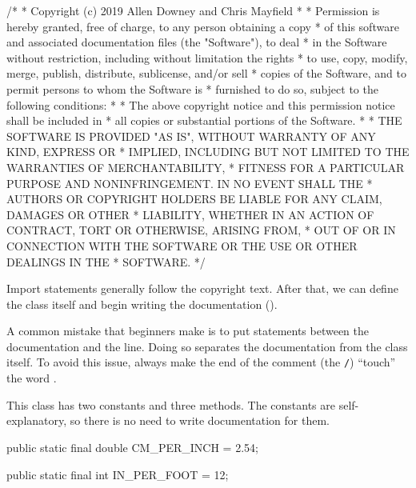 \begin{scriptsize}
\begin{code}
/*
 * Copyright (c) 2019 Allen Downey and Chris Mayfield
 *
 * Permission is hereby granted, free of charge, to any person obtaining a copy
 * of this software and associated documentation files (the "Software"), to deal
 * in the Software without restriction, including without limitation the rights
 * to use, copy, modify, merge, publish, distribute, sublicense, and/or sell
 * copies of the Software, and to permit persons to whom the Software is
 * furnished to do so, subject to the following conditions:
 *
 * The above copyright notice and this permission notice shall be included in
 * all copies or substantial portions of the Software.
 *
 * THE SOFTWARE IS PROVIDED "AS IS", WITHOUT WARRANTY OF ANY KIND, EXPRESS OR
 * IMPLIED, INCLUDING BUT NOT LIMITED TO THE WARRANTIES OF MERCHANTABILITY,
 * FITNESS FOR A PARTICULAR PURPOSE AND NONINFRINGEMENT. IN NO EVENT SHALL THE
 * AUTHORS OR COPYRIGHT HOLDERS BE LIABLE FOR ANY CLAIM, DAMAGES OR OTHER
 * LIABILITY, WHETHER IN AN ACTION OF CONTRACT, TORT OR OTHERWISE, ARISING FROM,
 * OUT OF OR IN CONNECTION WITH THE SOFTWARE OR THE USE OR OTHER DEALINGS IN THE
 * SOFTWARE.
 */
\end{code}
\end{scriptsize}

Import statements generally follow the copyright text.
After that, we can define the class itself and begin writing the documentation (\java{/**}).

\begin{code}
import java.util.Scanner;

/**
 * Methods for converting to/from the metric system.
 *
 * @author Allen Downey
 * @author Chris Mayfield
 * @version 6.1.5
 */
public class Convert {
\end{code}

A common mistake that beginners make is to put  statements between the documentation and the  line.
Doing so separates the documentation from the class itself.
To avoid this issue, always make the end of the comment (the \textcolor{comment}{\tt */}) ``touch'' the word .


This class has two constants and three methods.
The constants are self-explanatory, so there is no need to write documentation for them.

\begin{code}
public static final double CM_PER_INCH = 2.54;

public static final int IN_PER_FOOT = 12;
\end{code}

